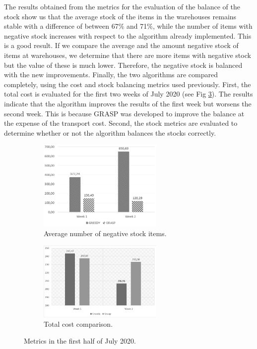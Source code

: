 \documentclass[letterpaper]{article} %
\begin{document}
The results obtained from the metrics for the evaluation of the balance of the stock show us that the average stock of the items in the warehouses remains stable with a difference of between 67\% and 71\%, while the number of items with negative stock increases with respect to the algorithm already implemented. This is a good result. If we compare the average and the amount negative stock of items at warehouses, we determine that there are more items with negative stock but the value of these is much lower. Therefore, the negative stock is balanced with the new improvements.
Finally, the two algorithms are compared completely, using the cost and stock balancing metrics used previously. First, the total cost is evaluated for the first two weeks of July 2020 (see Fig \ref{fig:weekcosts}).
The results indicate that the algorithm improves the results of the first week but worsens the second week. This is because GRASP was developed to improve the balance at the expense of the transport cost. Second, the stock metrics are evaluated to determine whether or not the algorithm balances the stocks correctly.

\begin{figure}[H]
    \begin{subfigure}{.5\textwidth}
        \centering
        \includegraphics[width=6cm]{img/averagestocknegativeALGOTH.png}
        \caption{Average number of negative stock items.}
        \label{fig:weeksaverage}
    \end{subfigure}
    \begin{subfigure}{.5\textwidth}
      \centering
      \includegraphics[width=6cm]{img/cost.png}
        \caption{Total cost comparison.}
        \label{fig:weekcosts}
    \end{subfigure}
    \caption{Metrics in the first half of July 2020.}
\end{figure}
\end{document}
